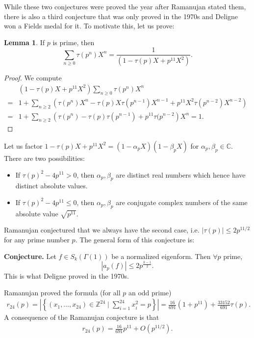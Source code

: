 \documentclass{article}
\theoremstyle{definition}
\newtheorem{lemma}[theorem]{Lemma}
\begin{document}
While these two conjectures were proved the year after Ramanujan stated them, there is also a third conjecture that was only proved in the 1970s and Deligne won a Fields medal for it. To motivate this, let us prove:
\begin{lemma}
    If $p$ is prime, then $$\sum_{n\ge 0}^{} \tau(p^n)X^n =  \frac{1}{(1-\tau(p)X+p^{11} X^2)}.$$
\end{lemma}
\begin{proof}
    We compute 
    \begin{align*}
        &(1-\tau(p)X+p^{11}X^2)\sum_{n\ge 0}^{} \tau(p^n)X^n \\
        =&  1 + \sum_{n\ge 2}^{} \left(\tau(p^n)X^n -\tau(p)X \tau(p^{n-1})X^{n-1} + p^{11}X^2\tau(p^{n-2})X^{n-2}\right) \\
        =&  1 + \sum_{n\ge 2}^{} \left(\tau(p^n)-\tau(p)\tau(p^{n-1})+p^{11}\tau(p^{n-2}\right)X^n = 1.
    \end{align*}
\end{proof}
Let us factor $1 - \tau(p)X + p^{11}X^2 = (1-\alpha_pX)(1-\beta_pX)$ for $\alpha_p, \beta_p \in \mathbb{C}$. There are two possibilities:
\begin{itemize}
    \item If $\tau(p)^2-4p^{11}>0$, then $\alpha_p,\beta_p$ are distinct real numbers which hence have distinct absolute values.
    \item If $\tau(p)^2-4p^{11}\le 0$, then $\alpha_p, \beta_p$ are conjugate complex numbers of the same absolute value $\sqrt{p^{11}}$.
\end{itemize}
Ramanujan conjectured that we always have the second case, i.e. $|\tau(p)|\le 2 p^{11/2}$ for any prime number $p$. The general form of this conjecture is:

\textbf{Conjecture.} Let $f \in S_k(\Gamma(1))$ be a normalized eigenform. Then $\forall p$ prime, $$|a_p(f)|\le 2p^{\frac{k-1}{2}}.$$ 
This is what Deligne proved in the 1970s.
\vspace{1mm}
 
Ramanujan proved the formula (for all $p$ an odd prime)
\begin{align*}
    r_{24}(p) = \left|\left\{(x_1,\ldots,x_{24}) \in \mathbb{Z}^{24} \mid \sum_{i=1}^{24} x_i^2 = p\right\}\right| = \frac{16}{691}(1+p^{11}) + \frac{33152}{691}\tau(p).
\end{align*}
A consequence of the Ramanujan conjecture is that 
\begin{align*}
    r_{24}(p) = \frac{16}{691}p^{11} + O(p^{11/2}).
\end{align*}
\end{document}
